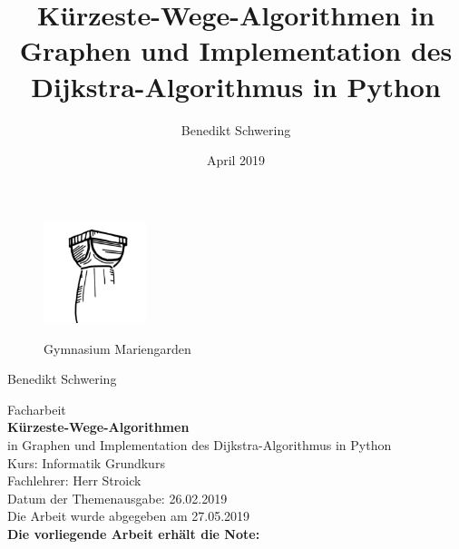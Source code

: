 \documentclass[12pt]{article}
\title{Kürzeste-Wege-Algorithmen in Graphen und Implementation des Dijkstra-Algorithmus in Python}
\author{Benedikt Schwering}
\date{April 2019}
\begin{document}
	\begin{figure}[htbp]
		\begin{minipage}[t]{3cm}
			\vspace{0pt}
			\flushleft
			\includegraphics[width=3cm, height=3cm]{LogoMariengarden}
			\label{fig:LogoGymnasiumMariengarden}
		\end{minipage}
		\hfill
		\begin{minipage}[t]{6cm}
			\vspace{0pt}
			\flushleft
			{\Large Gymnasium Mariengarden}
		\end{minipage}
	\end{figure}
	\begin{flushright}
	\large{Benedikt Schwering}
	\end{flushright}
	
	\begin{center}
	\vspace{30pt}
	{\LARGE Facharbeit}\\
	\vspace{50pt}
	\textbf{{\Huge Kürzeste-Wege-Algorithmen}}\\
	{\large in Graphen und Implementation des Dijkstra-Algorithmus in Python\\}
	\vspace{200pt}
	{\large Kurs: Informatik Grundkurs\\
		Fachlehrer: Herr Stroick\\
		Datum der Themenausgabe: 26.02.2019\\
		Die Arbeit wurde abgegeben am 27.05.2019\\}
	\vspace{20pt}
	\textbf{{\LARGE Die vorliegende Arbeit erhält die Note:}}
	\end{center}
	\newpage
	\tableofcontents
	\newpage
	\setcounter{page}{2}
	
\end{document}
